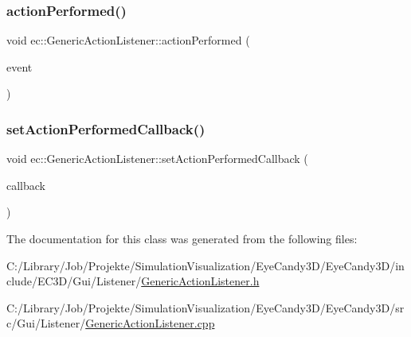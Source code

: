 \subsubsection{\texorpdfstring{action\+Performed()}{actionPerformed()}}
{\footnotesize\ttfamily void ec\+::\+Generic\+Action\+Listener\+::action\+Performed (\begin{DoxyParamCaption}\item[{const agui\+::\+Action\+Event \&}]{event }\end{DoxyParamCaption})\hspace{0.3cm}{\ttfamily [override]}}

\mbox{\label{classec_1_1_generic_action_listener_ae824ead75dce8eae0910da7432e3c400}} 
\subsubsection{\texorpdfstring{set\+Action\+Performed\+Callback()}{setActionPerformedCallback()}}
{\footnotesize\ttfamily void ec\+::\+Generic\+Action\+Listener\+::set\+Action\+Performed\+Callback (\begin{DoxyParamCaption}\item[{const \mbox{\hyperlink{classec_1_1_generic_action_listener_ab58c5e9b4caf14e4d1b1e50ffff5e628}{Action\+Performed\+\_\+\+Callback}} \&}]{callback }\end{DoxyParamCaption})}



The documentation for this class was generated from the following files\+:\begin{DoxyCompactItemize}
\item 
C\+:/\+Library/\+Job/\+Projekte/\+Simulation\+Visualization/\+Eye\+Candy3\+D/\+Eye\+Candy3\+D/include/\+E\+C3\+D/\+Gui/\+Listener/\mbox{\hyperlink{_generic_action_listener_8h}{Generic\+Action\+Listener.\+h}}\item 
C\+:/\+Library/\+Job/\+Projekte/\+Simulation\+Visualization/\+Eye\+Candy3\+D/\+Eye\+Candy3\+D/src/\+Gui/\+Listener/\mbox{\hyperlink{_generic_action_listener_8cpp}{Generic\+Action\+Listener.\+cpp}}\end{DoxyCompactItemize}
